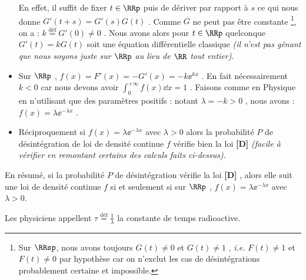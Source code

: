 \begin{itemize}[label=\small\textbullet]
	\smallskip\noindent
	En effet, il suffit de fixer $t \in \RRp$ puis de dériver par rapport à $s$ ce qui nous donne $G'(t+s) = G'(s) G(t)$ .
	Comme $G$ ne peut pas être constante
	\footnote{
		Sur $\RRsp$, nous avons toujours $G(t) \neq 0$ et $G(t) \neq 1$ , \emph{i.e.} $F(t) \neq 1$ et $F(t) \neq 0$ par hypothèse car on n'exclut les cas de désintégrations probablement certaine et impossible.
	},
	on a : $k \stackrel{\text{déf}}{=} G'(0) \neq 0$ .
	Nous avons alors pour $t \in \RRp$ quelconque $G'(t) = k G(t)$ soit une équation différentielle classique \emph{(il n'est pas gênant que nous soyons juste sur $\RRp$ au lieu de $\RR$ tout entier)}.

	


	\medskip
	\item Sur $\RRp$ , $f(x) = F'(x) = -G'(x) = -k \ee^{kx}$ . En fait nécessairement $k < 0$ car nous devons avoir $\displaystyle \int_0^{+\infty} f(x) \dd{x} = 1$ . Faisons comme en Physique en n'utilisant que des paramètres positifs : notant $\lambda = - k > 0$ , nous avons : $f(x) = \lambda \ee^{- \lambda x}$ .




	\medskip
	\item Réciproquement si $f(x) = \lambda \ee^{- \lambda x}$ avec $\lambda > 0$ alors la probabilité $P$ de désintégration de loi de densité continue $f$ vérifie bien la loi \textbf{[D]} \emph{(facile à vérifier en \emph{\og remontant \fg} certains des calculs faits ci-dessus)}.
\end{itemize}




En résumé, si la probabilité $P$ de désintégration vérifie la loi \textbf{[D]} , alors elle suit une loi de densité continue $f$ si et seulement si sur $\RRp$ , $f(x) = \lambda \ee^{- \lambda x}$ avec $\lambda > 0$.




\begin{remark}
	Les physiciens appellent $\tau \stackrel{\text{déf}}{=} \frac{1}{\lambda}$ la constante de temps radioactive.
\end{remark}

